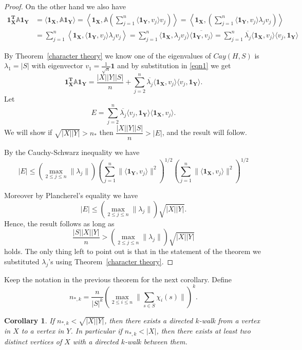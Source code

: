 \documentclass[11pt,reqno]{amsart}
\newtheorem{cor}[thm]{Corollary}
\begin{document}
\begin{proof}
On the other hand we also have  
\begin{align} 
\boldsymbol{1^T_{X}} \mathbb{A} \boldsymbol{1_{Y}}&= \langle \boldsymbol{1_{X}},\mathbb{A} \boldsymbol{1_{Y}} \rangle = \left\langle \boldsymbol{1_{X}}, \mathbb{A} \left( \sum_{j=1}^n \langle \boldsymbol{1_{Y}}, v_{j} \rangle v_{j} \right) \right\rangle = \left\langle \boldsymbol{1_{X}}, \left( \sum_{j=1}^n \langle \boldsymbol{1_{Y}}, v_j \rangle \lambda_{j} v_{j} \right) \right\rangle \nonumber \\ &=\sum_{j=1}^n \left\langle \boldsymbol{1_{X}}, \langle \boldsymbol{1_{Y}}, v_{j} \rangle \lambda_{j} v_{j} \right\rangle= \sum_{j=1}^n \langle \boldsymbol{1_{X}},\lambda_{j} v_j \rangle \overline {\langle \boldsymbol{1_{Y}}, v_{j} \rangle} =\sum_{j=1}^n  \overline {\lambda_{j}}  \langle \boldsymbol{1_{X}}, v_{j} \rangle \langle v_{j},  \boldsymbol{1_{Y}} \rangle\label{eqn1} 
\end{align}

By Theorem~\ref{character theory} we know one of the eigenvalues of $Cay(H,S)$ is $\lambda_1=|S|$ with eigenvector $v_1= \frac{1}{\sqrt{n}}\boldsymbol{1}$ and by substitution in \eqref{eqn1} we get
\[\boldsymbol{1^T_{X}} \mathbb{A} \boldsymbol{1_{Y}} = \frac{|X||Y||S|}{n} + \sum_{j=2}^n \overline {\lambda_{j}}  \langle \boldsymbol{1_{X}}, v_j \rangle \langle v_{j} , \boldsymbol{1_{Y}} \rangle.\] Let \[E = \sum_{j=2}^n \overline{\lambda_j} \langle  v_j , \boldsymbol{1_{Y}} \rangle \langle \boldsymbol{1_{X}}, v_j \rangle .\] We will show if $\sqrt{|X||Y|} > n_{\ast}$ then $\dfrac{|X||Y||S|}{n} > |E|$, and the result will follow.

By the Cauchy-Schwarz inequality we have \[ |E| \leqslant ( \max_{2 \leqslant j \leqslant n} \| \lambda_j \| ) \left(\sum_{j=1}^n \| \langle \boldsymbol{1_{Y}} ,v_j \rangle \|^2 \right)^{1/2} \left(\sum_{j=1}^n \| \langle \boldsymbol{1_{X}} ,v_j \rangle \|^2 \right)^{1/2} \] 

Moreover by Plancherel's equality we have \[ \lvert E \rvert \leqslant \left( \max_{2 \leqslant j \leqslant n} \| \lambda_j \| \right) \sqrt{\lvert X \rvert \lvert Y \rvert}.\] Hence, the result follows as long as \[ \frac{|S| \lvert X \rvert \lvert Y\rvert}{n} > \left( \max_{2 \leqslant j \leqslant n} \| \lambda_j \| \right) \sqrt{\lvert X \rvert \lvert Y \rvert} \] holds. The only thing left to point out is that in the statement of the theorem we substituted $\lambda_j$'s using Theorem~\ref{character theory}.
\end{proof}
Keep the notation in the previous theorem for the next corollary. Define \[ n_{\ast,k}= \frac{n}{|S|^{k}} \left( \max_{2 \leqslant i \leqslant n} \Big\| \sum_{s \in S} \chi_{i}(s) \Big\| \right)^{k}.\]
\begin{cor} \label{fancy spectral gap theorem}
If $n_{\ast,k} < \sqrt{|X||Y|}$, then there exists a directed $k$-walk from a vertex in $X$ to a vertex in $Y$. In particular if $n_{\ast,k} < |X|$, then there exists at least two distinct vertices of $X$ with a directed $k$-walk between them.
\end{cor}
\end{document}
